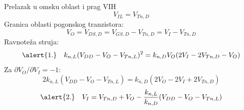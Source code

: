 \begin{frame}[label=09_1-s053]{Prelazak u omsku oblast i prag VIH}\setlength{\parskip}{2pt}\setlength{\abovedisplayskip}{4pt}\setlength{\belowdisplayskip}{4pt}\setlength{\abovedisplayshortskip}{3pt}\setlength{\belowdisplayshortskip}{3pt}
\[V_{IL}=V_{Tn,D}\]
Granica oblasti pogonskog tranzistora:\[V_O=V_{DS,D}=V_{GS,D}-V_{Tn,D}=V_I-V_{Tn,D}\]
Ravnoteža struja:\[\alert{1.}\quad k_{n,L}(V_{DD}-V_O-V_{Tn,L})^2=k_{n,D}V_O(2V_I-2V_{Tn,D}-V_O)\]
Za $\partial V_O/\partial V_I=-1$:
\[2k_{n,L}(V_{DD}-V_O-V_{Tn,L})=k_{n,D}(2V_O-2V_I+2V_{Tn,D})\]
\[\alert{2.}\quad V_I=V_{Tn,D}+V_O-\frac{k_{n,L}}{k_{n,D}}(V_{DD}-V_O-V_{Tn,L})\]

\end{frame}

